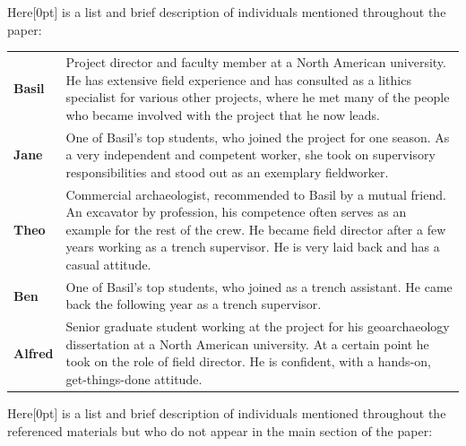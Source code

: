 \documentclass[
]{article}
\newcommand{\paragraphnumber}[1]{\marginnote{\color{lightgray}\tiny{#1}}[0pt]}
\begin{document}
Here\paragraphnumber{[50]} is a list and brief description of
individuals mentioned throughout the paper:

\begin{longtable}[]{@{}
  >{\raggedright\arraybackslash}p{}
  >{\raggedright\arraybackslash}p{}@{}}
\toprule\noalign{}
\endhead
\bottomrule\noalign{}
\endlastfoot
\textbf{Basil} & Project director and faculty member at a North American
university. He has extensive field experience and has consulted as a
lithics specialist for various other projects, where he met many of the
people who became involved with the project that he now leads. \\
\textbf{Jane} & One of Basil's top students, who joined the project for
one season. As a very independent and competent worker, she took on
supervisory responsibilities and stood out as an exemplary
fieldworker. \\
\textbf{Theo} & Commercial archaeologist, recommended to Basil by a
mutual friend. An excavator by profession, his competence often serves
as an example for the rest of the crew. He became field director after a
few years working as a trench supervisor. He is very laid back and has a
casual attitude. \\
\textbf{Ben} & One of Basil's top students, who joined as a trench
assistant. He came back the following year as a trench supervisor. \\
\textbf{Alfred} & Senior graduate student working at the project for his
geoarchaeology dissertation at a North American university. At a certain
point he took on the role of field director. He is confident, with a
hands-on, get-things-done attitude. \\
\end{longtable}

Here\paragraphnumber{[51]} is a list and brief description of
individuals mentioned throughout the referenced materials but who do not
appear in the main section of the paper:
\end{document}
